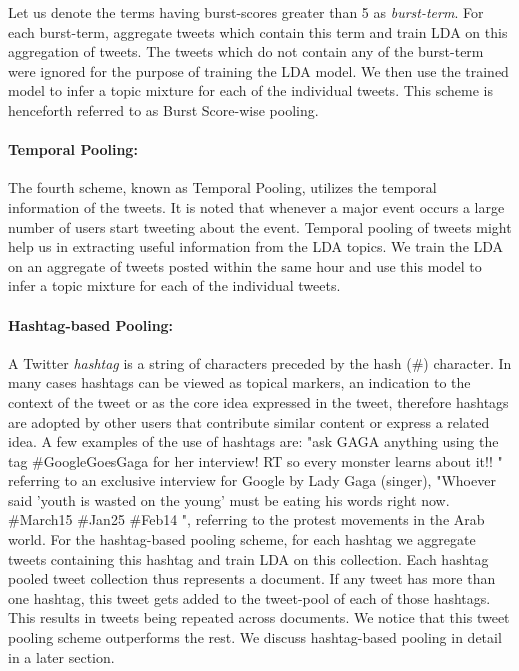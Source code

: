 \documentclass[10pt,a5paper,twoside]{article}
\begin{document}
Let us denote the terms having burst-scores greater than 5 as
\textit{burst-term}. For each burst-term, aggregate tweets which
contain this term and train LDA on this aggregation of tweets. The
tweets which do not contain any of the burst-term were ignored for the
purpose of training the LDA model. We then use the trained model to
infer a topic mixture for each of the individual tweets. This scheme
is henceforth referred to as Burst Score-wise pooling.

\paragraph{Temporal Pooling: }

The fourth scheme, known as Temporal Pooling, utilizes the temporal
information of the tweets. It is noted that whenever a major event
occurs a large number of users start tweeting about the
event. Temporal pooling of tweets might help us in extracting useful
information from the LDA topics. We train the LDA on an aggregate of
tweets posted within the same hour and use this model to infer a topic
mixture for each of the individual tweets.

\paragraph{Hashtag-based Pooling:}

A Twitter \textit{hashtag} is a string of characters preceded by the
hash (\#) character. In many cases hashtags can be viewed as topical
markers, an indication to the context of the tweet or as the core idea
expressed in the tweet, therefore hashtags are adopted by other users
that contribute similar content or express a related idea. A few
examples of the use of hashtags are: "ask GAGA anything using the tag
\#GoogleGoesGaga for her interview! RT so every monster learns about
it!! " referring to an exclusive interview for Google by Lady Gaga
(singer), "Whoever said 'youth is wasted on the young' must be eating
his words right now. \#March15 \#Jan25 \#Feb14 ", referring to the
protest movements in the Arab world.  For the hashtag-based pooling
scheme, for each hashtag we aggregate tweets containing this hashtag
and train LDA on this collection. Each hashtag pooled tweet collection
thus represents a document. If any tweet has more than one hashtag,
this tweet gets added to the tweet-pool of each of those
hashtags. This results in tweets being repeated across documents. We
notice that this tweet pooling scheme outperforms the rest. We discuss
hashtag-based pooling in detail in a later section.
\end{document}
